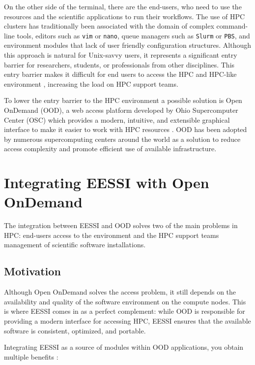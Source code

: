 \documentclass[11pt,a4paper]{article}
\begin{document}
On the other side of the terminal, there are the end-users, who need to use the resources and the scientific applications to run their workflows. The use of HPC clusters has traditionally been associated with the domain of complex command-line tools, editors such as \texttt{vim} or \texttt{nano}, queue managers such as \texttt{Slurm} or \texttt{PBS}, and environment modules that lack of user friendly configuration structures. Although this approach is natural for Unix-savvy users, it represents a significant entry barrier for researchers, students, or professionals from other disciplines. This entry barrier makes it difficult for end users to access the HPC and HPC-like environment \citep{Chalker2024}, increasing the load on HPC support teams.

To lower the entry barrier to the HPC environment a possible solution is Open OnDemand (OOD), a web access platform developed by Ohio Supercomputer Center (OSC) which provides a modern, intuitive, and extensible graphical interface to make it easier to work with HPC resources \citep{Chalker2024}. OOD has been adopted by numerous supercomputing centers around the world as a solution to reduce access complexity and promote efficient use of available infrastructure.

\section{Integrating EESSI with Open OnDemand}

The integration between EESSI and OOD solves two of the main problems in HPC: end-users access to the environment and the HPC support teams management of scientific software installations.

\subsection{Motivation}

Although Open OnDemand solves the access problem, it still depends on the availability and quality of the software environment on the compute nodes. This is where EESSI comes in as a perfect complement: while OOD is responsible for providing a modern interface for accessing HPC, EESSI ensures that the available software is consistent, optimized, and portable.

Integrating EESSI as a source of modules within OOD applications, you obtain multiple benefits :
\end{document}
